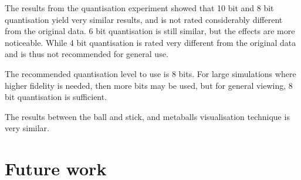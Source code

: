 The results from the quantisation experiment showed that 10 bit and 8 bit
quantisation yield very similar results, and is not rated considerably
different from the original data.  6 bit quantisation is still similar, but the
effects are more noticeable. While 4 bit quantisation is rated very different
from the original data and is thus not recommended for general use.

The recommended quantisation level to use is 8 bits.  For large simulations
where higher fidelity is needed, then more bits may be used, but for general
viewing, 8 bit quantisation is sufficient.

The results between the ball and stick, and metaballs visualisation technique
is very similar.


\section{Future work}
\label{sec:conclusion_future}



